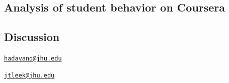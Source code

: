 \subsection{Analysis of student behavior on
Coursera}\label{analysis-of-student-behavior-on-coursera}

\subsection{Discussion}\label{discussion}



\address{%
Aboozar Hadavand\\
Bloomberg School of Public Health, Johns Hopkins University\\
615 N. Wolfe Street\\ Baltimore, MD 21205, USA\\
}
\href{mailto:hadavand@jhu.edu}{\nolinkurl{hadavand@jhu.edu}}

\address{%
Jeffrey Leek\\
Bloomberg School of Public Health, Johns Hopkins University\\
615 N. Wolfe Street\\ Baltimore, MD 21205, USA\\
}
\href{mailto:jtleek@jhu.edu}{\nolinkurl{jtleek@jhu.edu}}

